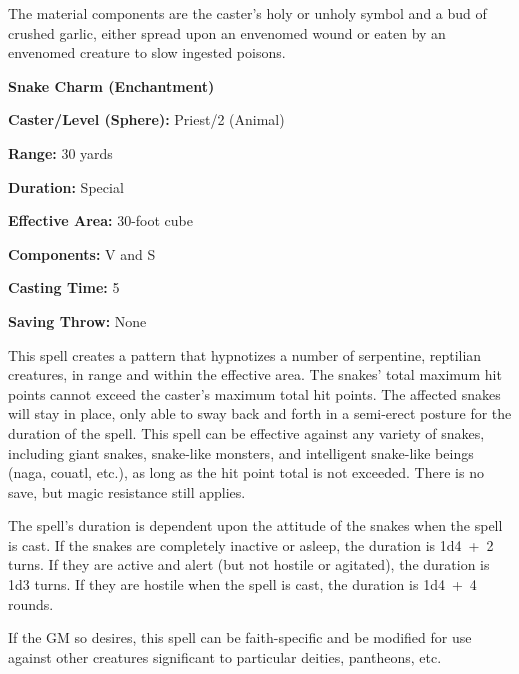 \begin{multicols}{2}
The material components are the caster's holy or unholy symbol and a bud of crushed garlic, either spread upon an envenomed wound or eaten by an envenomed creature to slow ingested poisons.

\vspace{1em}

\noindent
\begin{minipage}{\columnwidth}

\noindent \textbf{Snake Charm (Enchantment)}

\noindent \textbf{Caster/Level (Sphere):} Priest/2 (Animal)

\noindent \textbf{Range:} 30 yards

\noindent \textbf{Duration:} Special

\noindent \textbf{Effective Area:} 30-foot cube

\noindent \textbf{Components:} V and S

\noindent \textbf{Casting Time:} 5

\noindent \textbf{Saving Throw:} None

\end{minipage}

This spell creates a pattern that hypnotizes a number of serpentine, reptilian creatures, in range and within the effective area.  The snakes' total maximum hit points cannot exceed the caster's maximum total hit points.   The affected snakes will stay in place, only able to sway back and forth in a semi-erect posture for the duration of the spell.  This spell can be effective against any variety of snakes, including giant snakes, snake-like monsters, and intelligent snake-like beings (naga, couatl, etc.), as long as the hit point total is not exceeded.  There is no save, but magic resistance still applies.

The spell's duration is dependent upon the attitude of the snakes when the spell is cast.  If the snakes are completely inactive or asleep, the duration is 1d4~+~2 turns.  If they are active and alert (but not hostile or agitated), the duration is 1d3 turns.  If they are hostile when the spell is cast, the duration is 1d4~+~4 rounds. 

If the GM so desires, this spell can be faith-specific and be modified for use against other creatures significant to particular deities, pantheons, etc.

\vspace{1em}

\noindent
\begin{minipage}{\columnwidth}


\end{minipage}
\end{multicols}
